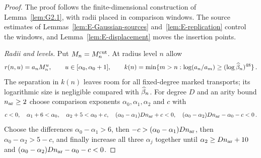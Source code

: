 \begin{proof}
The proof follows the finite-dimensional construction of Lemma~\ref{lem:G2.1}, with radii placed in comparison windows. The source estimates of Lemmas~\ref{lem:E-Gaussian-sources} and~\ref{lem:E-replication} control the windows, and Lemma~\ref{lem:E-displacement} moves the insertion points.

\emph{Radii and levels.} Put $M_n=M^{\mathrm{cut}}_n$. At radius level $n$ allow
\begin{equation}\label{eq:I-reading}
r(n,u)=a_nM_n^u,\qquad u\in[\alpha_0,\alpha_0+1],\qquad
k(n)=\min\{m>n:\log(a_n/a_m)\ge(\log\widehat{\beta}_n)^{48}\}\,.
\end{equation}
The separation in $k(n)$ leaves room for all fixed-degree marked transports; its logarithmic size is negligible compared with $\widehat{\beta}_n$. For degree $D$ and an arity bound $n_{\rm ar}\ge2$ choose comparison exponents $\alpha_0,\alpha_1,\alpha_2$ and $c$ with
\begin{equation*}
 c<0,\quad \alpha_1+6<\alpha_0,\quad \alpha_2+5<\alpha_0+c,\quad
 (\alpha_0-\alpha_1)Dn_{\rm ar}+c<0,\quad
 (\alpha_0-\alpha_2)Dn_{\rm ar}-\alpha_0-c<0\,.
\end{equation*}
Choose the differences $\alpha_0-\alpha_1>6$, then $-c>(\alpha_0-\alpha_1)Dn_{\rm ar}$, then $\alpha_0-\alpha_2>5-c$, and finally increase all three $\alpha_j$ together until $\alpha_2\ge Dn_{\rm ar}+10$ and $(\alpha_0-\alpha_2)Dn_{\rm ar}-\alpha_0-c<0$.


\end{proof}
